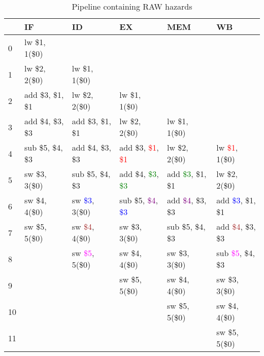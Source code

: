 \begin{table}[h]
    \begin{tabular}{l|lllll}
    ~  & IF                & ID                                  & EX                                                      & MEM                                   & WB \\ \hline
    0  & lw \$1, 1(\$0)    & ~                                   & ~                                                       & ~                                     & ~  \\
    1  & lw \$2, 2(\$0)    & lw \$1, 1(\$0)                      & ~                                                       & ~                                     & ~  \\
    2  & add \$3, \$1, \$1 & lw \$2, 2(\$0)                      & lw \$1, 1(\$0)                                          & ~                                     & ~  \\
    3  & add \$4, \$3, \$3 & add \$3, \$1, \$1                   & lw \$2, 2(\$0)                                          & lw \$1, 1(\$0)                        & ~  \\
    4  & sub \$5, \$4, \$3 & add \$4, \$3, \$3                   & add \$3, \textcolor{red}{\$1}, \textcolor{red}{\$1}     & lw \$2, 2(\$0)                        & lw \textcolor{red}{\$1}, 1(\$0)   \\
    5  & sw \$3, 3(\$0)    & sub \$5, \$4, \$3                   & add \$4, \textcolor{green}{\$3}, \textcolor{green}{\$3} & add \textcolor{green}{\$3}, \$1, \$1  & lw \$2, 2(\$0)   \\
    6  & sw \$4, 4(\$0)    & sw \textcolor{blue}{\$3}, 3(\$0)    & sub \$5, \textcolor{purple}{\$4}, \textcolor{blue}{\$3} & add \textcolor{purple}{\$4}, \$3, \$3 & add \textcolor{blue}{\$3}, \$1, \$1 \\
    7  & sw \$5, 5(\$0)    & sw \textcolor{brown}{\$4}, 4(\$0)   & sw \$3, 3(\$0)                                          & sub \$5, \$4, \$3                     & add \textcolor{brown}{\$4}, \$3, \$3 \\
    8  & ~                 & sw \textcolor{magenta}{\$5}, 5(\$0) & sw \$4, 4(\$0)                                          & sw \$3, 3(\$0)                        & sub \textcolor{magenta}{\$5}, \$4, \$3 \\
    9  & ~                 & ~                                   & sw \$5, 5(\$0)                                          & sw \$4, 4(\$0)                        & sw \$3, 3(\$0)   \\
    10 & ~                 & ~                                   & ~                                                       & sw \$5, 5(\$0)                        & sw \$4, 4(\$0)   \\
    11 & ~                 & ~                                   & ~                                                       & ~                                     & sw \$5, 5(\$0)   \\
    \end{tabular}
\caption{Pipeline containing RAW hazards}
\label{tbl:forwarding}
\end{table}

